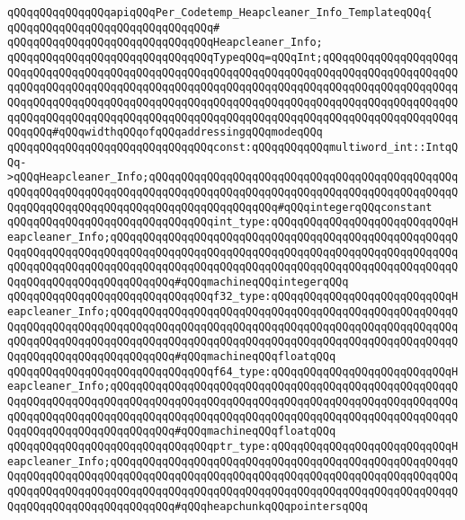 \verb|qQQqqQQqqQQqqQQqapiqQQqPer_Codetemp_Heapcleaner_Info_TemplateqQQq{|\newline
\verb|qQQqqQQqqQQqqQQqqQQqqQQqqQQqqQQq#|\newline
\verb|qQQqqQQqqQQqqQQqqQQqqQQqqQQqqQQqHeapcleaner_Info;|\newline
\newline
\verb|qQQqqQQqqQQqqQQqqQQqqQQqqQQqqQQqTypeqQQq=qQQqInt;qQQqqQQqqQQqqQQqqQQqqQQqqQQqqQQqqQQqqQQqqQQqqQQqqQQqqQQqqQQqqQQqqQQqqQQqqQQqqQQqqQQqqQQqqQQqqQQqqQQqqQQqqQQqqQQqqQQqqQQqqQQqqQQqqQQqqQQqqQQqqQQqqQQqqQQqqQQqqQQqqQQqqQQqqQQqqQQqqQQqqQQqqQQqqQQqqQQqqQQqqQQqqQQqqQQqqQQqqQQqqQQqqQQqqQQqqQQqqQQqqQQqqQQqqQQqqQQqqQQqqQQqqQQqqQQqqQQqqQQqqQQqqQQqqQQqqQQqqQQqqQQqqQQq#qQQqwidthqQQqofqQQqaddressingqQQqmodeqQQq|\newline
\newline
\verb|qQQqqQQqqQQqqQQqqQQqqQQqqQQqqQQqconst:qQQqqQQqqQQqmultiword_int::IntqQQq->qQQqHeapcleaner_Info;qQQqqQQqqQQqqQQqqQQqqQQqqQQqqQQqqQQqqQQqqQQqqQQqqQQqqQQqqQQqqQQqqQQqqQQqqQQqqQQqqQQqqQQqqQQqqQQqqQQqqQQqqQQqqQQqqQQqqQQqqQQqqQQqqQQqqQQqqQQqqQQqqQQqqQQqqQQqqQQq#qQQqintegerqQQqconstant|\newline
\newline
\verb|qQQqqQQqqQQqqQQqqQQqqQQqqQQqqQQqint_type:qQQqqQQqqQQqqQQqqQQqqQQqqQQqHeapcleaner_Info;qQQqqQQqqQQqqQQqqQQqqQQqqQQqqQQqqQQqqQQqqQQqqQQqqQQqqQQqqQQqqQQqqQQqqQQqqQQqqQQqqQQqqQQqqQQqqQQqqQQqqQQqqQQqqQQqqQQqqQQqqQQqqQQqqQQqqQQqqQQqqQQqqQQqqQQqqQQqqQQqqQQqqQQqqQQqqQQqqQQqqQQqqQQqqQQqqQQqqQQqqQQqqQQqqQQqqQQqqQQq#qQQqmachineqQQqintegerqQQq|\newline
\verb|qQQqqQQqqQQqqQQqqQQqqQQqqQQqqQQqf32_type:qQQqqQQqqQQqqQQqqQQqqQQqqQQqHeapcleaner_Info;qQQqqQQqqQQqqQQqqQQqqQQqqQQqqQQqqQQqqQQqqQQqqQQqqQQqqQQqqQQqqQQqqQQqqQQqqQQqqQQqqQQqqQQqqQQqqQQqqQQqqQQqqQQqqQQqqQQqqQQqqQQqqQQqqQQqqQQqqQQqqQQqqQQqqQQqqQQqqQQqqQQqqQQqqQQqqQQqqQQqqQQqqQQqqQQqqQQqqQQqqQQqqQQqqQQqqQQqqQQq#qQQqmachineqQQqfloatqQQq|\newline
\verb|qQQqqQQqqQQqqQQqqQQqqQQqqQQqqQQqf64_type:qQQqqQQqqQQqqQQqqQQqqQQqqQQqHeapcleaner_Info;qQQqqQQqqQQqqQQqqQQqqQQqqQQqqQQqqQQqqQQqqQQqqQQqqQQqqQQqqQQqqQQqqQQqqQQqqQQqqQQqqQQqqQQqqQQqqQQqqQQqqQQqqQQqqQQqqQQqqQQqqQQqqQQqqQQqqQQqqQQqqQQqqQQqqQQqqQQqqQQqqQQqqQQqqQQqqQQqqQQqqQQqqQQqqQQqqQQqqQQqqQQqqQQqqQQqqQQqqQQq#qQQqmachineqQQqfloatqQQq|\newline
\verb|qQQqqQQqqQQqqQQqqQQqqQQqqQQqqQQqptr_type:qQQqqQQqqQQqqQQqqQQqqQQqqQQqHeapcleaner_Info;qQQqqQQqqQQqqQQqqQQqqQQqqQQqqQQqqQQqqQQqqQQqqQQqqQQqqQQqqQQqqQQqqQQqqQQqqQQqqQQqqQQqqQQqqQQqqQQqqQQqqQQqqQQqqQQqqQQqqQQqqQQqqQQqqQQqqQQqqQQqqQQqqQQqqQQqqQQqqQQqqQQqqQQqqQQqqQQqqQQqqQQqqQQqqQQqqQQqqQQqqQQqqQQqqQQqqQQqqQQq#qQQqheapchunkqQQqpointersqQQq|\newline
